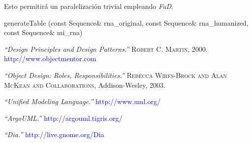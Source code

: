 \documentclass[12pt,a4paper,spanish]{article}
\begin{document}
\par Esto permitirá un paralelización trivial empleando \emph{FuD}.

\begin{center}
\textsf{generateTable (const Sequence\& rna\_original, const Sequence\& rna\_humanized, const Sequence\& mi\_rna)}
\end{center}


\begin{thebibliography}{99}
\small  {} {\em{“Design Principles and Design Patterns.”}} 
		\textsc{Robert C. Martin}, 2000. \textcolor{blue}{http://www.objectmentor.com}
  
\small  {} {\em{“Object Design: Roles, Responsibilities.”}} 
		\textsc{Rebecca Wirfs-Brock and Alan McKean and Collaborations}, Addison-Wesley, 2003.  

\small  {} {\em{“Unified Modeling Language.”}} \textcolor{blue}{http://www.uml.org/}

\small  {} {\em{“ArgoUML.”}} \textcolor{blue}{http://argouml.tigris.org/}

\small {} {\em{“Dia.”}} \textcolor{blue}{http://live.gnome.org/Dia}
\end{thebibliography}
\end{document}
